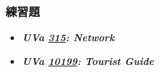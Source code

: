 \subsubsection*{練習題}
\begin{itemize}[label={\Checkmark}]
\item \textbf{\textit{UVa \href{http://uva.onlinejudge.org/external/3/315.html}{315}: Network}}\\

\item \textbf{\textit{UVa \href{http://uva.onlinejudge.org/external/101/10199.html}{10199}: Tourist Guide}}\\

\end{itemize}